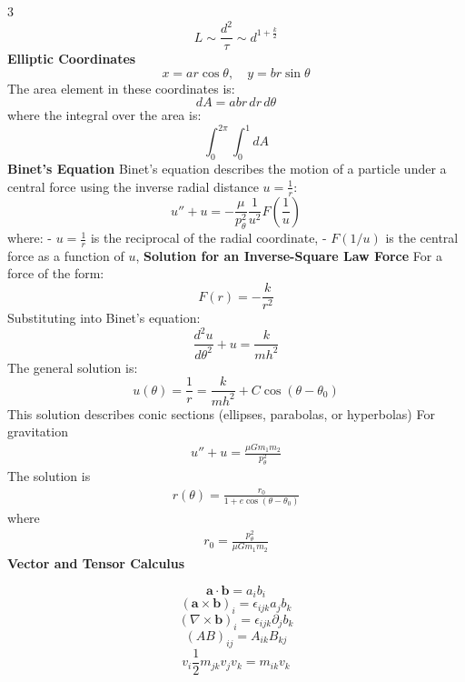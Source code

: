 \documentclass[1pt]{article}
\begin{document}
\begin{multicols}{3}
\begin{equation*}
    L \sim \frac{d^2}{\tau} \sim d^{1 + \frac{k}{2}}
\end{equation*}
\textbf{Elliptic Coordinates}
\begin{equation*}
    x = a r \cos\theta, \quad y = b r \sin\theta
\end{equation*}
The area element in these coordinates is:
\begin{equation*}
    dA = a b r \, dr \, d\theta
\end{equation*}
where the integral over the area is:
\begin{equation*}
    \int_0^{2\pi} \int_0^1 dA
\end{equation*}
\textbf{Binet’s Equation}
Binet's equation describes the motion of a particle under a central force using the inverse radial distance \( u = \frac{1}{r} \):
\begin{equation*}
u''+u=-\frac{\mu }{p_\theta^{2}}\frac{1}{u^{2}}F(\frac{1}{u}) \end{equation*}
where:
- \( u = \frac{1}{r} \) is the reciprocal of the radial coordinate,
- \( F(1/u) \) is the central force as a function of \( u \),
\textbf{Solution for an Inverse-Square Law Force}
For a force of the form:
\begin{equation*}
    F(r) = -\frac{k}{r^2}
\end{equation*}
Substituting into Binet’s equation:
\begin{equation*}
    \frac{d^2 u}{d\theta^2} + u = \frac{k}{m h^2}
\end{equation*}
The general solution is:
\begin{equation*}
    u(\theta) = \frac{1}{r} = \frac{k}{m h^2} + C \cos(\theta - \theta_0)
\end{equation*}
This solution describes conic sections (ellipses, parabolas, or hyperbolas)
For gravitation 
\begin{align*}
    u'' + u = \frac{\mu G m_1 m_2}{p_\theta^2}
\end{align*}
The solution is 
\begin{align*}
    r(\theta) = \frac{r_0}{1 + e \cos(\theta - \theta_0)}
\end{align*}
where
\begin{align*}
    r_0 = \frac{p_\theta^2}{\mu G m_1 m_2}
\end{align*}
\textbf{Vector and Tensor Calculus}

\begin{equation*}
    \mathbf{a} \cdot \mathbf{b} = a_i b_i
\end{equation*}
\begin{equation*}
    ( \mathbf{a} \times \mathbf{b} )_i = \epsilon_{ijk} a_j b_k
\end{equation*}
\begin{equation*}
    (\nabla \times \mathbf{b})_i = \epsilon_{ijk} \partial_j b_k
\end{equation*}
\begin{equation*}
    (AB)_{ij} = A_{ik} B_{kj}
\end{equation*}
\begin{equation*}
    v_i \frac{1}{2} m_{jk} v_j v_k = m_{ik} v_k
\end{equation*}


\end{multicols}
\end{document}

